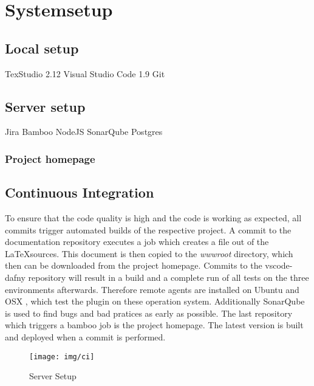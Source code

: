 \section{Systemsetup}
\subsection{Local setup}
TexStudio 2.12\newline
Visual Studio Code 1.9\newline
Git 


\subsection{Server setup}
Jira \newline
Bamboo\newline
NodeJS\newline
SonarQube\newline
Postgres

\subsubsection{Project homepage}

\subsection{Continuous Integration}

To ensure that the code quality is high and the code is working as expected, all commits trigger automated builds of the respective project. A commit to the documentation repository executes a job which creates a file out of the \LaTeX sources. This document is then copied to the \emph{wwwroot} directory, which then can be downloaded from the project homepage. Commits to the vscode-dafny repository will result in a build and a complete run of all tests on the three environments afterwards. Therefore remote agents are installed on Ubuntu and OSX , which test the plugin on these operation system.  Additionally SonarQube is used to find bugs and bad pratices as early as possible. The last repository which triggers a bamboo job is the project homepage. The latest version is built and deployed when a commit is performed. 


\begin{figure}[H]
	\centering
	\texttt{[image: img/ci]}
	\caption{Server Setup}
	\label{fig:Server setup}
\end{figure}